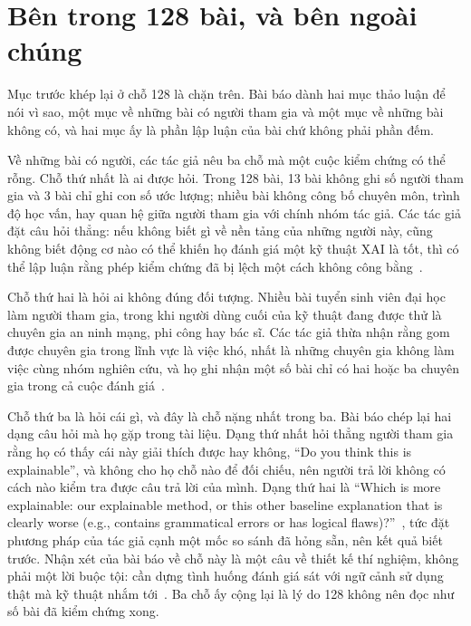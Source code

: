 \section{Bên trong 128 bài, và bên ngoài chúng}
\label{sec:ch12-nghien-cuu-khong-co-nguoi}

%
Mục trước khép lại ở chỗ 128 là chặn trên. Bài báo dành hai mục thảo luận để
nói vì sao, một mục về những bài có người tham gia và một mục về những bài
không có, và hai mục ấy là phần lập luận của bài chứ không phải phần đếm.

Về những bài có người, các tác giả nêu ba chỗ mà một cuộc kiểm chứng có thể
rỗng. Chỗ thứ nhất là ai được hỏi. Trong 128 bài, 13 bài không ghi số người
tham gia và 3 bài chỉ ghi con số ước lượng; nhiều bài không công bố chuyên
môn, trình độ học vấn, hay quan hệ giữa người tham gia với chính nhóm tác giả.
Các tác giả đặt câu hỏi thẳng: nếu không biết gì về nền tảng của những người
này, cũng không biết động cơ nào có thể khiến họ đánh giá một kỹ thuật XAI là
tốt, thì có thể lập luận rằng phép kiểm chứng đã bị lệch một cách không công
bằng~\autocite{p24humangap}.

Chỗ thứ hai là hỏi ai không đúng đối tượng. Nhiều bài tuyển sinh viên đại học
làm người tham gia, trong khi người dùng cuối của kỹ thuật đang được thử là
chuyên gia an ninh mạng, phi công hay bác sĩ. Các tác giả thừa nhận rằng gom
được chuyên gia trong lĩnh vực là việc khó, nhất là những chuyên gia không làm
việc cùng nhóm nghiên cứu, và họ ghi nhận một số bài chỉ có hai hoặc ba chuyên
gia trong cả cuộc đánh giá~\autocite{p24humangap}.

Chỗ thứ ba là hỏi cái gì, và đây là chỗ nặng nhất trong ba. Bài báo chép lại
hai dạng câu hỏi mà họ gặp trong tài liệu. Dạng thứ nhất hỏi thẳng người tham
gia rằng họ có thấy cái này giải thích được hay không, \enquote{Do you think
this is explainable}, và không cho họ chỗ nào để đối chiếu, nên người trả lời
không có cách nào kiểm tra được câu trả lời của mình. Dạng thứ hai là
\enquote{Which is more explainable: our explainable method, or this other
baseline explanation that is clearly worse (e.g., contains grammatical errors
or has logical flaws)?}~\autocite{p24humangap}, tức đặt phương pháp của tác giả
cạnh một mốc so sánh đã hỏng sẵn, nên kết quả biết trước. Nhận xét của bài báo về chỗ này là
một câu về thiết kế thí nghiệm, không phải một lời buộc tội: cần dựng tình
huống đánh giá sát với ngữ cảnh sử dụng thật mà kỹ thuật nhắm
tới~\autocite{p24humangap}. Ba chỗ ấy cộng lại là lý do 128 không nên đọc như
số bài đã kiểm chứng xong.

